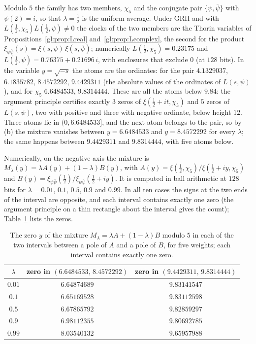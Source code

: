 Modulo $5$ the family has two members, $\chi_5$ and the conjugate pair $\{\psi,\bar\psi\}$ with $\psi(2)=i$, so that $\lambda=\tfrac12$ is the uniform average. Under GRH and with $L(\tfrac12,\chi_5)L(\tfrac12,\psi)\neq0$ the clocks of the two members are the Thorin variables of Propositions~\ref{gl:prop:Lreal} and~\ref{gl:prop:Lcomplex}, the second for the product $\xi_{\psi\bar\psi}(s)=\xi(s,\psi)\,\xi(s,\bar\psi)$; numerically $L(\tfrac12,\chi_5)=0.23175$ and $L(\tfrac12,\psi)=0.76375+0.21696\,i$, with enclosures that exclude $0$ (at $128$ bits). In the variable $y=\sqrt{-s}$ the atoms are the ordinates: for the pair $4.1329037$, $6.1835782$, $8.4572292$, $9.4429311$ (the absolute values of the ordinates of $L(s,\psi)$), and for $\chi_5$ $6.6484533$, $9.8314444$. These are all the atoms below $9.84$: the argument principle certifies exactly $3$ zeros of $\xi(\tfrac12+it,\chi_5)$ and $5$ zeros of $L(s,\psi)$, two with positive and three with negative ordinate, below height $12$. Three atoms lie in $(0,6.6484533]$, and the next atom belongs to the pair, so by (b) the mixture vanishes between $y=6.6484533$ and $y=8.4572292$ for every $\lambda$; the same happens between $9.4429311$ and $9.8314444$, with five atoms below.

Numerically, on the negative axis the mixture is $M_\lambda(y)=\lambda A(y)+(1-\lambda)B(y)$, with $A(y)=\xi(\tfrac12,\chi_5)/\xi(\tfrac12+iy,\chi_5)$ and $B(y)=\xi_{\psi\bar\psi}(\tfrac12)/\xi_{\psi\bar\psi}(\tfrac12+iy)$. It is computed in ball arithmetic at $128$ bits for $\lambda=0.01$, $0.1$, $0.5$, $0.9$ and $0.99$. In all ten cases the signs at the two ends of the interval are opposite, and each interval contains exactly one zero (the argument principle on a thin rectangle about the interval gives the count); Table~\ref{gl:tab:mixture} lists the zeros.

\begin{table}[htbp]
\caption{The zero $y$ of the mixture $M_\lambda=\lambda A+(1-\lambda)B$ modulo $5$ in each of the two intervals between a pole of $A$ and a pole of $B$, for five weights; each interval contains exactly one zero.}
\label{gl:tab:mixture}
\centering
\small
\begin{tabular}{ccc}
\toprule
$\lambda$ & zero in $(6.6484533,\,8.4572292)$ & zero in $(9.4429311,\,9.8314444)$\\
\midrule
$0.01$ & $6.64874689$ & $9.83141547$\\
$0.1$ & $6.65169528$ & $9.83112598$\\
$0.5$ & $6.67865792$ & $9.82859297$\\
$0.9$ & $6.98112355$ & $9.80692785$\\
$0.99$ & $8.03540132$ & $9.65957988$\\
\bottomrule
\end{tabular}
\end{table}

